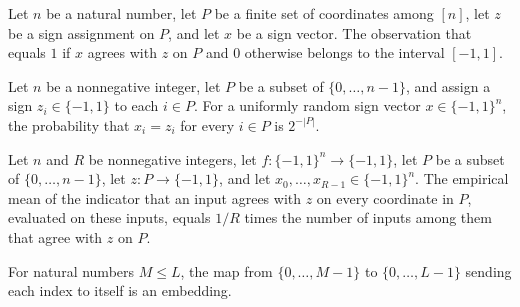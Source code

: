 \begin{theorem}
\label{FABL.juntaMatchObservation_mem_Icc}
\leanok
{}
Let $n$ be a natural number, let $P$ be a finite set of coordinates among $[n]$, let $z$
be a sign assignment on $P$, and let $x$ be a sign vector. The observation that equals
$1$ if $x$ agrees with $z$ on $P$ and $0$ otherwise belongs to the interval $[-1,1]$.
\end{theorem}

\begin{theorem}
\label{FABL.expect_juntaMatchObservation}
\leanok
{}
Let $n$ be a nonnegative integer, let $P$ be a subset of $\{0,\ldots,n-1\}$, and
assign a sign $z_i\in\{-1,1\}$ to each $i\in P$. For a uniformly random sign vector
$x\in\{-1,1\}^n$, the probability that $x_i=z_i$ for every $i\in P$ is $2^{-|P|}$.
\end{theorem}

\begin{theorem}
\label{FABL.finiteUniformEmpiricalMean_juntaMatchObservation}
\leanok
{}
Let $n$ and $R$ be nonnegative integers, let $f:\{-1,1\}^n\to\{-1,1\}$, let $P$ be a
subset of $\{0,\ldots,n-1\}$, let $z:P\to\{-1,1\}$, and let
$x_0,\ldots,x_{R-1}\in\{-1,1\}^n$. The empirical mean of the indicator that an input
agrees with $z$ on every coordinate in $P$, evaluated on these inputs, equals $1/R$
times the number of inputs among them that agree with $z$ on $P$.
\end{theorem}

\begin{definition}
\label{FABL.initialFinEmbedding}
\leanok
For natural numbers $M\le L$, the map from $\{0,\ldots,M-1\}$ to $\{0,\ldots,L-1\}$
sending each index to itself is an embedding.
\end{definition}

